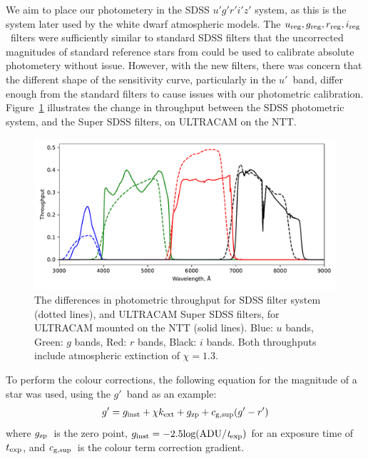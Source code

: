 We aim to place our photometery in the SDSS $u'g'r'i'z'$ system, as this is the system later used by the white dwarf atmospheric models. The $u_{\rm reg}, g_{\rm reg}, r_{\rm reg}, i_{\rm reg}$\ filters were sufficiently similar to standard SDSS filters that the uncorrected magnitudes of standard reference stars from \citet{smith2002} could be used to calibrate absolute photometery without issue. However, with the new filters, there was concern that the different shape of the sensitivity curve, particularly in the $u'$\ band, differ enough from the standard filters to cause issues with our photometric calibration. Figure~\ref{fig:sdss vs super filters} illustrates the change in throughput between the SDSS photometric system, and the Super SDSS filters, on ULTRACAM on the NTT. 

\begin{figure}
    \centering
    \includegraphics[width=\columnwidth]{figures/three_cvs_with_weird_colours/GeneralFigs/bandpass_diffs_SDSS_dots_UCAMNTT_solid.pdf}
    \caption{The differences in photometric throughput for SDSS filter system (dotted lines), and ULTRACAM Super SDSS filters, for ULTRACAM mounted on the NTT (solid lines). Blue: $u$ bands, Green: $g$ bands, Red: $r$ bands, Black: $i$ bands. Both throughputs include atmospheric extinction of $\chi = 1.3$.}
    \label{fig:sdss vs super filters}
\end{figure}


To perform the colour corrections, the following equation for the magnitude of a star was used, using the $g'$\ band as an example:
\begin{equation}
    \label{eqn:gen magnitudes}
    g' = g_{\rm inst} + \chi k_{\rm ext} + g_{\rm zp} + c_{\rm g, sup}(g'-r') 
\end{equation}
where $g_{\rm zp}$\ is the zero point, $g_{\rm inst} = -2.5 \rm log(ADU/{\it t}_{\rm exp})$
for an exposure time of $t_{\rm exp}$, and $c_{\rm g, sup}$\ is the colour term correction gradient. 


